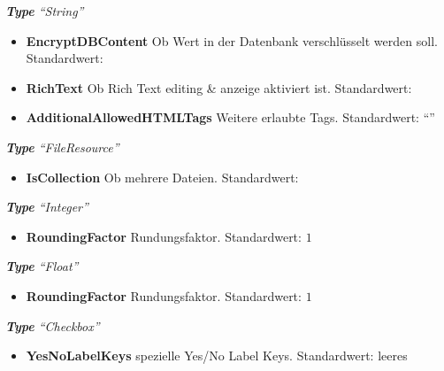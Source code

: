\begin{itemize}
\begin{itemize}
                            \-\hspace{2mm}\textit{\textbf{Type} ``String''}
                            \begin{itemize}
                                \item \textbf{EncryptDBContent}\superscript{*}  Ob Wert in der Datenbank verschlüsselt werden soll. Standardwert: 
                                \item \textbf{RichText}\superscript{*}  Ob Rich Text editing \& anzeige aktiviert ist. Standardwert: 
                                \item \textbf{AdditionalAllowedHTMLTags}\superscript{*}  Weitere erlaubte Tags. Standardwert: ``''
                            \end{itemize}

                            \-\hspace{2mm}\textit{\textbf{Type} ``FileResource''}
                            \begin{itemize}
                                \item \textbf{IsCollection}\superscript{*}  Ob mehrere Dateien. Standardwert: 
                            \end{itemize}

                            \-\hspace{2mm}\textit{\textbf{Type} ``Integer''}
                            \begin{itemize}
                                \item \textbf{RoundingFactor}\superscript{*}  Rundungsfaktor. Standardwert: $1$
                            \end{itemize}

                            \-\hspace{2mm}\textit{\textbf{Type} ``Float''}
                            \begin{itemize}
                                \item \textbf{RoundingFactor}\superscript{*}  Rundungsfaktor. Standardwert: $1$
                            \end{itemize}

                            \-\hspace{2mm}\textit{\textbf{Type} ``Checkbox''}
                            \begin{itemize}
                                \item \textbf{YesNoLabelKeys}\superscript{*}  spezielle Yes/No Label Keys. Standardwert: leeres 
                            \end{itemize}


\end{itemize}
\end{itemize}
